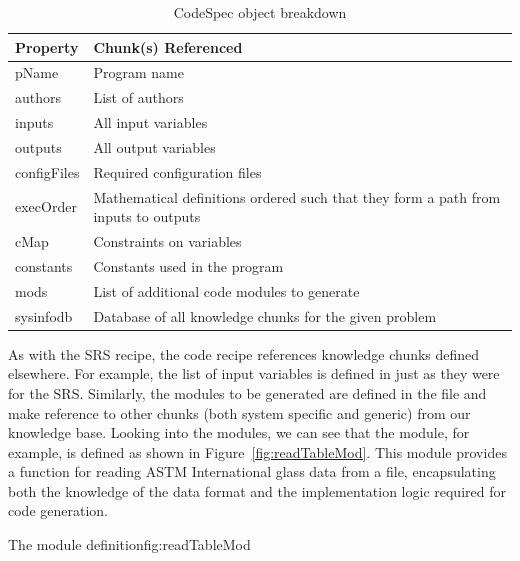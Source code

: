 \begin{table}[]
\caption{CodeSpec object breakdown}
\label{tab:codeSpecBreakdown}
\begin{tabular} {| P{.2\linewidth} | p{.74\linewidth}|}
\hline
\textbf{Property} & \textbf{Chunk(s) Referenced} 
\\ \hline 
	pName & Program name 
\\ \hline 
	authors & List of authors 
\\ \hline 
	inputs & All input variables 
\\\hline 
	outputs & All output variables 
\\\hline 
	configFiles & Required configuration files 
\\\hline 
	execOrder & Mathematical definitions ordered such that they form a path 
	from inputs to outputs 
\\\hline 
	cMap & Constraints on variables 
\\\hline 
	constants & Constants used in the program 
\\ \hline 
	mods & List of additional code modules to generate
\\ \hline 
	sysinfodb & Database of all knowledge chunks for the given problem
\\ \hline
\end{tabular}
\end{table}

As with the SRS recipe, the code recipe references knowledge chunks defined 
elsewhere. For example, the list of input variables is defined in 
 just as they were for the SRS. Similarly, the modules to be 
generated are defined in the  file and make reference to 
other chunks (both system specific and generic) from our knowledge base. Looking
into the modules, we can see that the  module, for example,
is defined as shown in Figure~\ref{fig:readTableMod}. This module provides a
function for reading ASTM International glass data from a file, encapsulating
both the knowledge of the data format and the implementation logic required for
code
generation.

{The  module definition}{fig:readTableMod}

